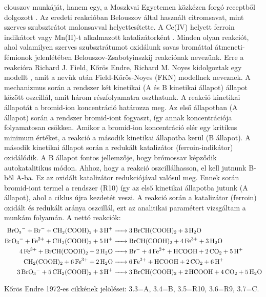 elouszov munkáját, hanem egy, a Moszkvai Egyetemen közkézen forgó receptből dolgozott \cite{winfree1984prehistory}. Az eredeti reakcióban Belouszov által használt citromsavat, mint szerves szubsztrátot malonsavval helyettesítette. A Ce(IV) helyett ferroin indikátort vagy Mn(II)-t alkalmazott katalizátorként \cite{miklososzcillalo}.
Minden olyan reakciót, ahol valamilyen szerves szubsztrátumot oxidálunk savas bromáttal átmeneti-fémionok jelenlétében Belouszov-Zsabotyinszkij reakciónak nevezünk. Erre a reakcióra Richard J. Field, Kőrös Endre, Richard M. Noyes kidolgoztak egy modellt \cite{noyes1972oscillations}, amit a nevük után Field-Kőrös-Noyes (FKN) modellnek neveznek. A mechanizmus során a rendszer két kinetikai (A és B kinetikai állapot) állapot között oszcillál, amit három részfolyamatra oszthatunk. A reakció kinetikai állapotát a bromid-ion koncentráció határozza meg.
Az első állapotban (A állapot) során a rendszer bromid-iont fogyaszt, így annak koncentrációja folyamatosan csökken. Amikor a bromid-ion koncentráció elér egy kritikus minimum értéket, a reakció a második kinetikai állapotba kerül (B állapot). A második kinetikai állapot során a redukált katalizátor (ferroin-indikátor) oxidálódik. A B állapot fontos jellemzője, hogy brómossav képződik autokatalitikus módon. Ahhoz, hogy a reakció oszcillálhasson, el kell jutnunk B-ből A-ba. Ez az oxidált katalizátor redukciójával valósul meg. Ennek során bromid-iont termel a rendszer (R10) így az első kinetikai állapotba jutunk (A állapot), ahol a ciklus újra kezdetét veszi. A reakció során a katalizátor (ferroin) oxidált és redukált aránya oszcillál, ezt az analitikai paramétert vizsgáltam a munkám folyamán. A nettó reakciók:\\

\small
\begin{align}
\small
\ce {BrO3^- + Br- + CH2(COOH)2 + 3 H+ &-> 3 BrCH(COOH)2 + 3 H2O}\\
\ce {BrO3^- + Fe^2+ + CH2(COOH)2 + 5 H+ &-> BrCH(COOH)2 + 4 Fe^3+ + 3 H2O}\\
\ce {4 Fe^3+ + BrCH(COOH)2 + 2 H2O &-> Br- + 4 Fe^2+ + HCOOH + 2 CO2 + 5 H+}\\
\ce {CH2(COOH)2 + 6 Fe^3+ + 2 H2O &-> 6 Fe^2+ + HCOOH + 2 CO2 + 6 H+}\\
\ce {3 BrO3^- + 5 CH2(COOH)2 + 3 H+ &-> 3 BrCH(COOH)2 + 2 HCOOH + 4 CO2 + 5 H2O}
\large
\end{align}
\large


Kőrös Endre 1972-es cikkének \cite{noyes1972oscillations} jelölései: 3.3=A, 3.4=B, 3.5=R10, 3.6=R9, 3.7=C.

